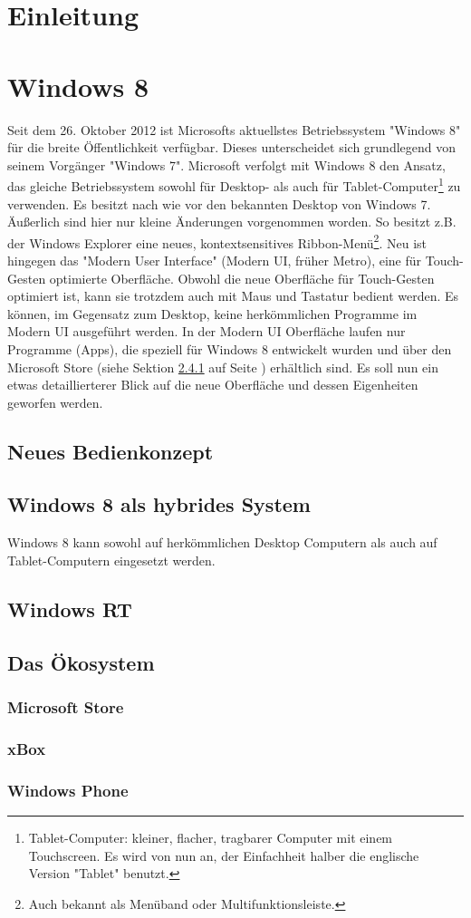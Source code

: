 \documentclass[12pt,a4paper]{scrartcl}
\author{Malte Modrow}
\begin{document}
\section{Einleitung}
\label{einleitung}
\newpage
\section{Windows 8}
\label{sec:windows8}
Seit dem 26. Oktober 2012 ist Microsofts aktuellstes Betriebssystem "Windows 8" für die breite Öffentlichkeit verfügbar. Dieses unterscheidet sich grundlegend von seinem Vorgänger "Windows 7". Microsoft verfolgt mit Windows 8 den Ansatz, das gleiche Betriebssystem sowohl für Desktop- als auch für Tablet-Computer\footnote{Tablet-Computer: kleiner, flacher, tragbarer Computer mit einem Touchscreen. Es wird von nun an, der Einfachheit halber die englische Version "Tablet" benutzt.} zu verwenden. Es besitzt nach wie vor den bekannten Desktop von Windows 7. Äußerlich sind hier nur kleine Änderungen vorgenommen worden. So besitzt z.B. der Windows Explorer eine neues, kontextsensitives Ribbon-Menü\footnote{Auch bekannt als Menüband oder Multifunktionsleiste.}. Neu ist hingegen das "Modern User Interface" (Modern UI, früher Metro), eine für Touch-Gesten optimierte Oberfläche. Obwohl die neue Oberfläche für Touch-Gesten optimiert ist, kann sie trotzdem auch mit Maus und Tastatur bedient werden. Es können, im Gegensatz zum Desktop, keine herkömmlichen Programme im Modern UI ausgeführt werden. In der Modern UI Oberfläche laufen nur Programme (Apps), die speziell für Windows 8 entwickelt wurden und über den Microsoft Store (siehe Sektion \ref{subsubsec:store} auf Seite \pageref{subsubsec:store}) erhältlich sind. Es soll nun ein etwas detaillierterer Blick auf die neue Oberfläche und dessen Eigenheiten geworfen werden.
\subsection{Neues Bedienkonzept}
\label{subsec:bedienkonzept}
\subsection{Windows 8 als hybrides System}
\label{subsec:hybrides system}
Windows 8 kann sowohl auf herkömmlichen Desktop Computern als auch auf Tablet-Computern eingesetzt werden. 
\subsection{Windows RT}
\label{subsec:winRT}
\subsection{Das Ökosystem}
\label{subsec:ökosystem}
\subsubsection{Microsoft Store}
\label{subsubsec:store}
\subsubsection{xBox}
\label{subsubsec:xbox}
\subsubsection{Windows Phone}
\label{subsubsec:windowsphone}
\end{document}

